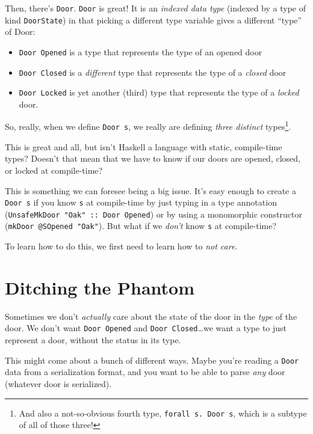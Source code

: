 \documentclass[]{article}
\begin{document}
Then, there's \texttt{Door}. \texttt{Door} is great! It is an \emph{indexed data
type} (indexed by a type of kind \texttt{DoorState}) in that picking a different
type variable gives a different ``type'' of Door:

\begin{itemize}
\tightlist
\item
  \texttt{Door\ \textquotesingle{}Opened} is a type that represents the type of
  an opened door
\item
  \texttt{Door\ \textquotesingle{}Closed} is a \emph{different} type that
  represents the type of a \emph{closed} door
\item
  \texttt{Door\ \textquotesingle{}Locked} is yet another (third) type that
  represents the type of a \emph{locked} door.
\end{itemize}

So, really, when we define \texttt{Door\ s}, we really are defining \emph{three
distinct} types\footnote{And also a not-so-obvious fourth type,
  \texttt{forall\ s.\ Door\ s}, which is a subtype of all of those three!}.

This is great and all, but isn't Haskell a language with static, compile-time
types? Doesn't that mean that we have to know if our doors are opened, closed,
or locked at compile-time?

This is something we can foresee being a big issue. It's easy enough to create a
\texttt{Door\ s} if you know \texttt{s} at compile-time by just typing in a type
annotation (\texttt{UnsafeMkDoor\ "Oak"\ ::\ Door\ \textquotesingle{}Opened}) or
by using a monomorphic constructor (\texttt{mkDoor\ @SOpened\ "Oak"}). But what
if we \emph{don't} know \texttt{s} at compile-time?

To learn how to do this, we first need to learn how to \emph{not care}.

\hypertarget{ditching-the-phantom}{%
\section{Ditching the Phantom}\label{ditching-the-phantom}}

Sometimes we don't \emph{actually} care about the state of the door in the
\emph{type} of the door. We don't want \texttt{Door\ \textquotesingle{}Opened}
and \texttt{Door\ \textquotesingle{}Closed}\ldots{}we want a type to just
represent a door, without the status in its type.

This might come about a bunch of different ways. Maybe you're reading a
\texttt{Door} data from a serialization format, and you want to be able to parse
\emph{any} door (whatever door is serialized).
\end{document}
